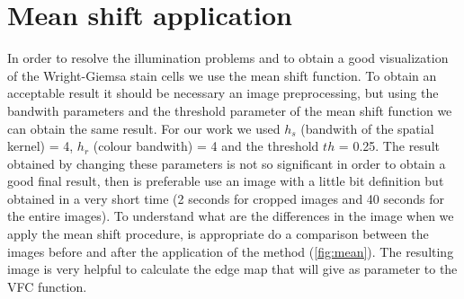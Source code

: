 \section{Mean shift application}
In order to resolve the illumination problems and to obtain a good visualization of the Wright-Giemsa stain cells we use the mean shift function. To obtain an acceptable result it should be necessary an image preprocessing, but using the bandwith parameters and the threshold parameter of the mean shift function we can obtain the same result. For our work we used $h_{s}$ (bandwith of the spatial kernel) = 4, $h_{r}$ (colour bandwith) = 4 and the threshold $th$ = 0.25. The result obtained by changing these parameters is not so significant in order to obtain a good final result, then is preferable use an image with a little bit definition but obtained in a very short time (2 seconds for cropped images and 40 seconds for the entire images). To understand what are the differences in the image when we apply the mean shift procedure, is appropriate do a comparison between the images before and after the application of the method (\ref{fig:mean}). The resulting image is very helpful to calculate the edge map that will give as parameter to the VFC function.
